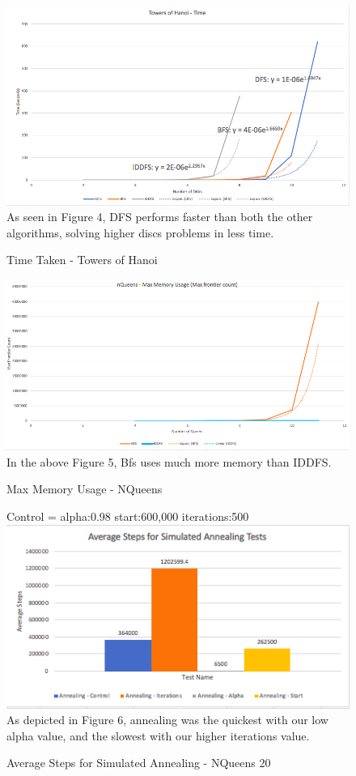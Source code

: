 \documentclass{article}
\begin{document}
\begin{figure}[!htb]
\caption{Time Taken - Towers of Hanoi}
\includegraphics[width=\textwidth]{Time.png}
As seen in Figure 4, DFS performs faster than both the other algorithms, solving higher discs problems in less time.
\end{figure}

\begin{figure}[!htb]
\caption{Max Memory Usage - NQueens}
\includegraphics[width=\textwidth]{QMem.png}
In the above Figure 5, Bfs uses much more memory than IDDFS.
\end{figure}

\begin{figure}[!htb]
\caption{Average Steps for Simulated Annealing - NQueens 20}
Control = alpha:0.98 start:600,000 iterations:500
\includegraphics[width=\textwidth]{AvgSteps.png}
As depicted in Figure 6, annealing was the quickest with our low alpha value, and the slowest with our higher iterations value.
\end{figure}
\end{document}

